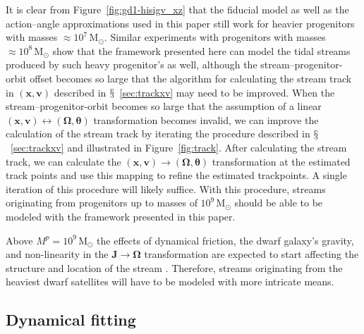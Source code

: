 \documentclass{emulateapj}
\newcommand{\eg}{e.g.}
\renewcommand{\figurename}{Figure}
\newcommand{\sectionname}{$\mathsection$}
\renewcommand{\vec}[1]{\ensuremath{\mathbf{#1}}}
\newcommand{\vecx}{\ensuremath{\vec{x}}}
\newcommand{\vecv}{\ensuremath{\vec{v}}}
\newcommand{\vecj}{\ensuremath{\vec{J}}}
\newcommand{\veco}{\ensuremath{\vec{\Omega}}}
\newcommand{\veca}{\ensuremath{\boldsymbol\theta}}
\newcommand{\msun}{\ensuremath{\,\mathrm{M}_{\odot}}}
\begin{document}
It is clear from \figurename~\ref{fig:gd1-hisigv_xz} that the fiducial
model as well as the action--angle approximations used in this paper
still work for heavier progenitors with masses $\approx
10^7\msun$. Similar experiments with progenitors with masses $\approx
10^8\msun$ show that the framework presented here can model the tidal
streams produced by such heavy progenitor's as well, although the
stream--progenitor-orbit offset becomes so large that the algorithm
for calculating the stream track in $(\vecx,\vecv)$ described in
\sectionname~\ref{sec:trackxv} may need to be improved. When the
stream--progenitor-orbit becomes so large that the assumption of a
linear $(\vecx,\vecv) \leftrightarrow (\veco,\veca)$ transformation
becomes invalid, we can improve the calculation of the stream track by
iterating the procedure described in \sectionname~\ref{sec:trackxv}
and illustrated in \figurename~\ref{fig:track}. After calculating the
stream track, we can calculate the $(\vecx,\vecv) \rightarrow
(\veco,\veca)$ transformation at the estimated track points and use
this mapping to refine the estimated trackpoints. A single iteration
of this procedure will likely suffice. With this procedure, streams
originating from progenitors up to masses of $10^9\msun$ should be
able to be modeled with the framework presented in this paper.

Above $M^p = 10^9\msun$ the effects of dynamical friction, the dwarf
galaxy's gravity, and non-linearity in the $\vecj \rightarrow \veco$
transformation are expected to start affecting the structure and
location of the stream \citep[\eg,][]{Sanders13a}. Therefore, streams
originating from the heaviest dwarf satellites will have to be modeled
with more intricate means.

\subsection{Dynamical fitting}
\end{document}
